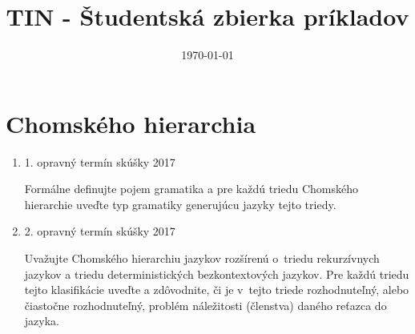 \documentclass[]{article}
\begin{document}
	
	
	\title{TIN - Študentská zbierka príkladov}
	\date{\today}
	
	\maketitle
	\newpage
	\tableofcontents
	\newpage
	
	\section{Chomského hierarchia}
	
	\begin{enumerate}
		\item 1. opravný termín skúšky 2017
		
		Formálne definujte pojem gramatika a pre každú triedu Chomského hierarchie uveďte typ gramatiky generujúcu jazyky tejto triedy.
		
		\item 2. opravný termín skúšky 2017
		
		Uvažujte Chomského hierarchiu jazykov rozšírenú o~triedu rekurzívnych jazykov a triedu deterministických bezkontextových jazykov. Pre každú triedu tejto klasifikácie uveďte a zdôvodnite, či je v~tejto triede rozhodnuteľný, alebo čiastočne rozhodnuteľný, problém náležitosti (členstva) daného reťazca do jazyka.
	\end{enumerate}
\end{document}
